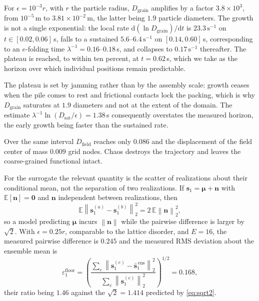 \documentclass[11pt]{article}
\newcommand{\E}{\mathbb{E}}
\newcommand{\bs}[1]{\boldsymbol{#1}}
\newcommand{\norm}[1]{\left\lVert #1 \right\rVert}
\begin{document}
For $\epsilon = 10^{-3} r$, with $r$ the particle radius, $D_{\text{grain}}$ amplifies by a
factor $3.8 \times 10^{3}$, from $10^{-5}$\,m to $3.81 \times 10^{-2}$\,m, the latter being
$1.9$ particle diameters. The growth is not a single exponential: the local rate
$\mathrm{d}(\ln D_{\text{grain}})/\mathrm{d}t$ is $23.3\,\mathrm{s}^{-1}$ on
$t \in [0.02, 0.06]$\,s, falls to a sustained $5.6$--$6.4\,\mathrm{s}^{-1}$ on
$[0.14, 0.60]$\,s, corresponding to an $e$-folding time
$\lambda^{-1} = 0.16$--$0.18$\,s, and collapses to $0.17\,\mathrm{s}^{-1}$ thereafter. The
plateau is reached, to within ten percent, at $t = 0.62$\,s, which we take as the horizon
over which individual positions remain predictable.

The plateau is set by jamming rather than by the assembly scale: growth ceases when the pile
comes to rest and frictional contacts lock the packing, which is why $D_{\text{grain}}$
saturates at $1.9$ diameters and not at the extent of the domain. The estimate
$\lambda^{-1} \ln (D_{\text{sat}}/\epsilon) = 1.38$\,s consequently overstates the measured
horizon, the early growth being faster than the sustained rate.

Over the same interval $D_{\text{field}}$ reaches only $0.086$ and the displacement of the
field center of mass $0.009$ grid nodes. Chaos destroys the trajectory and leaves the
coarse-grained functional intact.

For the surrogate the relevant quantity is the scatter of realizations about their
conditional mean, not the separation of two realizations. If
$\bs{s}_1 = \bs{\mu} + \bs{n}$ with $\E[\bs{n}] = \bs{0}$ and $\bs{n}$ independent between
realizations, then
\begin{equation}
  \E \norm{\bs{s}_1^{(a)} - \bs{s}_1^{(b)}}_2^2 = 2\,\E\norm{\bs{n}}_2^2 ,
  \label{eq:sqrt2}
\end{equation}
so a model predicting $\bs{\mu}$ incurs $\norm{\bs{n}}$ while the pairwise difference is
larger by $\sqrt{2}$. With $\epsilon = 0.25 r$, comparable to the lattice disorder, and
$E = 16$, the measured pairwise difference is $0.245$ and the measured RMS deviation about
the ensemble mean is
\begin{equation}
  \varepsilon^{\text{floor}}_1 = \left(
  \frac{\sum_{e} \norm{ \bs{s}_1^{(e)} - \bar{\bs{s}}_1^{\,\text{ens}} }_2^2}{
  \sum_{e} \norm{ \bs{s}_1^{(e)} }_2^2} \right)^{1/2} = 0.168 ,
  \label{eq:floor}
\end{equation}
their ratio being $1.46$ against the $\sqrt{2} = 1.414$ predicted by \eqref{eq:sqrt2}.
\end{document}
